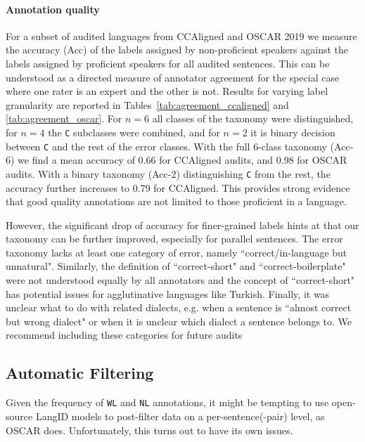\paragraph{Annotation quality}
For a subset of audited languages from CCAligned and OSCAR 2019 we measure the accuracy (Acc) of the labels assigned by non-proficient speakers against the labels assigned by proficient speakers for all audited sentences. This can be understood as a directed measure of annotator agreement for the special case where one rater is an expert and the other is not. Results for varying label granularity are reported in Tables~\ref{tab:agreement_ccaligned} and \ref{tab:agreement_oscar}. For $n=6$ all classes of the taxonomy were distinguished, for $n=4$ the \texttt{C} subclasses were combined, and for $n=2$ it is binary decision between \texttt{C} and the rest of the error classes. With the full 6-class taxonomy (Acc-6) we find a mean accuracy of 0.66
for CCAligned audits, and 0.98
for OSCAR audits. %
With a binary taxonomy (Acc-2) distinguishing \texttt{C} from the rest, the accuracy further increases to 0.79
for CCAligned. This provides strong evidence that good quality annotations are not limited to those proficient in a language.

However, the significant drop of accuracy for finer-grained labels hints at that our taxonomy can be further improved, especially for parallel sentences.
The error taxonomy lacks at least one category of error, namely ``correct/in-language but unnatural".  Similarly, the definition of ``correct-short" and ``correct-boilerplate" were not understood equally by all annotators and the concept of ``correct-short" has potential issues for agglutinative languages like Turkish. Finally, it was unclear what to do with related dialects, e.g. when a sentence is ``almost correct but wrong dialect" or when it is unclear which dialect a sentence belongs to. We recommend including these categories for future audits

\subsection{Automatic Filtering}
Given the frequency of \texttt{WL} and \texttt{NL} annotations, it might be tempting to use open-source LangID models to post-filter data on a per-sentence(-pair) level, as OSCAR does. Unfortunately, this turns out to have its own issues.

